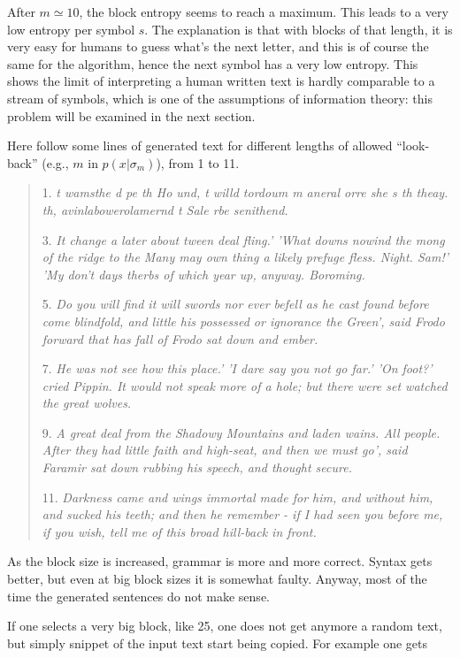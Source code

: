 \documentclass[conference]{IEEEtran}
\begin{document}
After $m \simeq 10$, the block entropy seems to reach a maximum. This leads to a very low entropy per symbol $s$. The explanation is that with blocks of that length, it is very easy for humans to guess what's the next letter, and this is of course the same for the algorithm, hence the next symbol has a very low entropy. This shows the limit of interpreting a human written text is hardly comparable to a stream of symbols, which is one of the assumptions of information theory: this problem will be examined in the next section.

Here follow some lines of generated text for different lengths of allowed ``look-back'' (e.g., $m$ in $p(x|\sigma_m)$), from 1 to 11.

\begin{quote}
1. \emph{t wamsthe d pe th Ho und, t willd tordoum m aneral orre she s th theay. th, avinlabowerolamernd t Sale rbe senithend.}

3. \emph{It change a later about tween deal fling.' 'What downs nowind the mong of the ridge to the Many may own thing a likely prefuge fless. Night. Sam!' 'My don't days therbs of which year up, anyway. Boroming.}

5. \emph{Do you will find it will swords nor ever befell as he cast found before come blindfold, and little his possessed or ignorance the Green', said Frodo forward that has fall of Frodo sat down and ember.}

7. \emph{He was not see how this place.' 'I dare say you not go far.' 'On foot?' cried Pippin. It would not speak more of a hole; but there were set watched the great wolves.}

9. \emph{A great deal from the Shadowy Mountains and laden wains. All people. After they had little faith and high-seat, and then we must go', said Faramir sat down rubbing his speech, and thought secure.}

11. \emph{Darkness came and wings immortal made for him, and without him, and sucked his teeth; and then he remember - if I had seen you before me, if you wish, tell me of this broad hill-back in front.}
\end{quote}

As the block size is increased, grammar is more and more correct. Syntax gets better, but even at big block sizes it is somewhat faulty. Anyway, most of the time the generated sentences do not make sense.

If one selects a very big block, like 25, one does not get anymore a random text, but simply snippet of the input text start being copied. For example one gets
\end{document}
